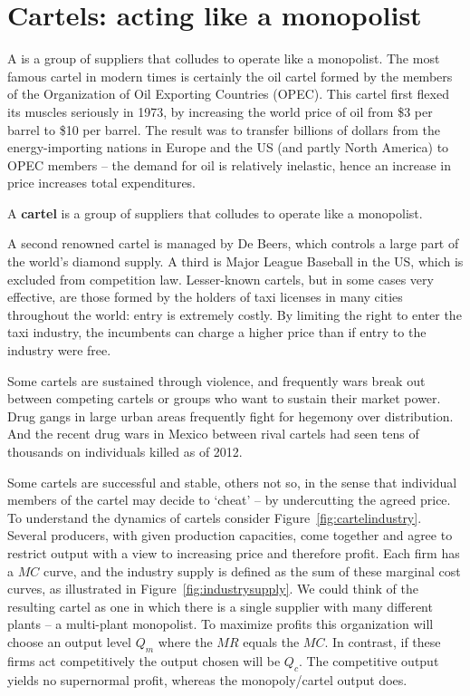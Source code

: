 \section{Cartels: acting like a monopolist} \label{sec:cartel}

A  is a group of suppliers that colludes to operate like a monopolist. The most famous cartel in modern times is certainly the oil cartel formed by the members of the Organization of Oil Exporting Countries (OPEC). This cartel first flexed its muscles seriously in 1973, by increasing the world price of oil from \$3 per barrel to \$10 per barrel. The result was to transfer billions of dollars from the energy-importing nations in Europe and the US (and partly North America) to OPEC members -- the demand for oil is relatively inelastic, hence an increase in price increases total expenditures.

\begin{DefBox}
A \textbf{cartel} is a group of suppliers that colludes to operate like a monopolist.
\end{DefBox}

A second renowned cartel is managed by De Beers, which controls a large part of the world's diamond supply.  A third is Major League Baseball in the US, which is excluded from competition law. Lesser-known cartels, but in some cases very effective, are those formed by the holders of taxi licenses in many cities throughout the world: entry is extremely costly. By limiting the right to enter the taxi industry, the incumbents can charge a higher price than if entry to the industry were free. 

Some cartels are sustained through violence, and frequently wars break out between competing cartels or groups who want to sustain their market power. Drug gangs in large urban areas frequently fight for hegemony over distribution. And the recent drug wars in Mexico between rival cartels had seen tens of thousands on individuals killed as of 2012. 

Some cartels are successful and stable, others not so, in the sense that individual members of the cartel may decide to `cheat' -- by undercutting the agreed price.  To understand the dynamics of cartels consider Figure~\ref{fig:cartelindustry}. Several producers, with given production capacities, come together and agree to restrict output with a view to increasing price and therefore profit. Each firm has a $MC$ curve, and the industry supply is defined as the sum of these marginal cost curves, as illustrated in Figure~\ref{fig:industrysupply}. We could think of the resulting cartel as one in which there is a single supplier with many different plants -- a multi-plant monopolist. To maximize profits this organization will choose an output level $Q_m$ where the $MR$ equals the $MC$. In contrast, if these firms act competitively the output chosen will be $Q_c$. The competitive output yields no supernormal profit, whereas the monopoly/cartel output does.

